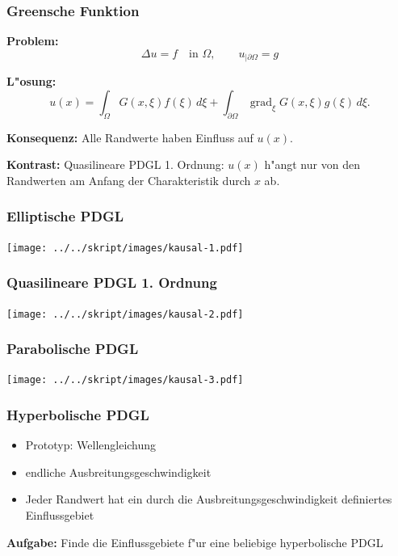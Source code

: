 \documentclass{beamer}
\begin{document}
\begin{frame}
\frametitle{Greensche Funktion}
{\bf Problem:}
\[
\Delta u=f\quad\text{in $\Omega$},\qquad u_{|\partial\Omega}=g
\]
\bigskip

{\bf L"osung:}
\[
u(x)
=
\int_{\Omega} G(x,\xi)f(\xi)\,d\xi
+
\int_{\partial\Omega}  \operatorname{grad}_\xi G(x,\xi) g(\xi)\,d\xi.
\]
\bigskip
\pause

{\bf Konsequenz:} Alle Randwerte haben Einfluss auf $u(x)$.

\bigskip
\pause

{\bf Kontrast:} Quasilineare PDGL 1. Ordnung: $u(x)$ h"angt nur von den
Randwerten am Anfang der Charakteristik durch $x$ ab.

\end{frame}

\begin{frame}
\frametitle{Elliptische PDGL}
\begin{center}
\texttt{[image: ../../skript/images/kausal-1.pdf]}
\end{center}
\end{frame}

\begin{frame}
\frametitle{Quasilineare PDGL 1. Ordnung}
\begin{center}
\texttt{[image: ../../skript/images/kausal-2.pdf]}
\end{center}
\end{frame}

\begin{frame}
\frametitle{Parabolische PDGL}
\begin{center}
\texttt{[image: ../../skript/images/kausal-3.pdf]}
\end{center}
\end{frame}

\begin{frame}
\frametitle{Hyperbolische PDGL}

\begin{itemize}[<+->]
\item
Prototyp: Wellengleichung
\item
endliche Ausbreitungsgeschwindigkeit
\item
Jeder Randwert hat ein durch die Ausbreitungsgeschwindigkeit
definiertes Einflussgebiet
\end{itemize}
\pause
\bigskip

{\bf Aufgabe:}
Finde die Einflussgebiete f"ur eine beliebige hyperbolische PDGL

\end{frame}
\end{document}
